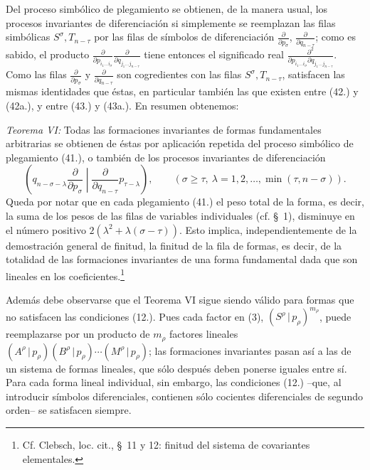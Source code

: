 \documentclass[11pt]{article}
\newcommand{\pair}[2]{(#1\,|\,#2)}
\begin{document}
Del proceso simbólico de plegamiento se obtienen, de la manera usual, los procesos invariantes de diferenciación si simplemente se reemplazan las filas simbólicas $S^\sigma,T_{n-\tau}$ por las filas de símbolos de diferenciación $\frac{\partial}{\partial p_\sigma}$, $\frac{\partial}{\partial q_{n-\tau}}$; como es sabido, el producto $\frac{\partial}{\partial p_{i_1\ldots i_\sigma}}\frac{\partial}{\partial q_{j_1\ldots j_{n-\tau}}}$ tiene entonces el significado real $\frac{\partial^2}{\partial p_{i_1\ldots i_\sigma}\partial q_{j_1\ldots j_{n-\tau}}}$. Como las filas $\frac{\partial}{\partial p_\sigma}$ y $\frac{\partial}{\partial q_{n-\tau}}$ son cogredientes con las filas $S^\sigma,T_{n-\tau}$, satisfacen las mismas identidades que éstas, en particular también las que existen entre (42.) y (42a.), y entre (43.) y (43a.). En resumen obtenemos:

\emph{Teorema VI:} Todas las formaciones invariantes de formas fundamentales arbitrarias se obtienen de éstas por aplicación repetida del proceso simbólico de plegamiento (41.), o también de los procesos invariantes de diferenciación
\begin{equation}
 \left(q_{n-\sigma-\lambda}\frac{\partial}{\partial p_\sigma}\middle|\frac{\partial}{\partial q_{n-\tau}}p_{\tau-\lambda}\right),
 \qquad(\sigma\ge\tau,\ \lambda=1,2,\ldots,\min(\tau,n-\sigma)).
\tag{45}
\end{equation}
Queda por notar que en cada plegamiento (41.) el peso total de la forma, es decir, la suma de los pesos de las filas de variables individuales (cf. \S\ 1), disminuye en el número positivo $2(\lambda^2+\lambda(\sigma-\tau))$. Esto implica, independientemente de la demostración general de finitud, la finitud de la fila de formas, es decir, de la totalidad de las formaciones invariantes de una forma fundamental dada que son lineales en los coeficientes.\footnote{Cf. Clebsch, loc. cit., \S\ 11 y 12: finitud del sistema de covariantes elementales.}

Además debe observarse que el Teorema VI sigue siendo válido para formas que no satisfacen las condiciones (12.). Pues cada factor en (3), $\pair{S^\rho}{p_\rho}^{m_\rho}$, puede reemplazarse por un producto de $m_\rho$ factores lineales $\pair{A^\rho}{p_\rho}\pair{B^\rho}{p_\rho}\cdots\pair{M^\rho}{p_\rho}$; las formaciones invariantes pasan así a las de un sistema de formas lineales, que sólo después deben ponerse iguales entre sí. Para cada forma lineal individual, sin embargo, las condiciones (12.) --que, al introducir símbolos diferenciales, contienen sólo cocientes diferenciales de segundo orden-- se satisfacen siempre.
\end{document}
